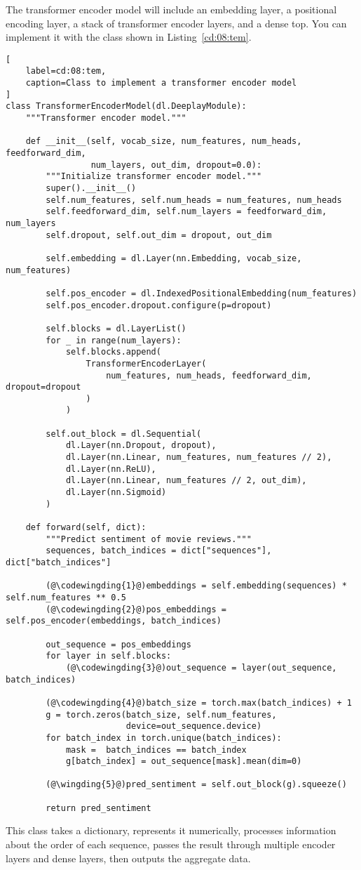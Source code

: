 The transformer encoder model will include an embedding layer, a positional encoding layer, a stack of transformer encoder layers, and a dense top.
You can implement it with the class shown in Listing~\ref{cd:08:tem}.
\begin{lstlisting}[
    label=cd:08:tem,
    caption=Class to implement a transformer encoder model
]
class TransformerEncoderModel(dl.DeeplayModule):
    """Transformer encoder model."""
    
    def __init__(self, vocab_size, num_features, num_heads, feedforward_dim,
                 num_layers, out_dim, dropout=0.0):
        """Initialize transformer encoder model."""
        super().__init__()
        self.num_features, self.num_heads = num_features, num_heads
        self.feedforward_dim, self.num_layers = feedforward_dim, num_layers
        self.dropout, self.out_dim = dropout, out_dim

        self.embedding = dl.Layer(nn.Embedding, vocab_size, num_features)
        
        self.pos_encoder = dl.IndexedPositionalEmbedding(num_features)
        self.pos_encoder.dropout.configure(p=dropout)

        self.blocks = dl.LayerList()
        for _ in range(num_layers):
            self.blocks.append(
                TransformerEncoderLayer(
                    num_features, num_heads, feedforward_dim, dropout=dropout
                )
            )
            
        self.out_block = dl.Sequential(
            dl.Layer(nn.Dropout, dropout),
            dl.Layer(nn.Linear, num_features, num_features // 2), 
            dl.Layer(nn.ReLU),
            dl.Layer(nn.Linear, num_features // 2, out_dim), 
            dl.Layer(nn.Sigmoid)
        )

    def forward(self, dict):
        """Predict sentiment of movie reviews."""
        sequences, batch_indices = dict["sequences"], dict["batch_indices"]

        (@\codewingding{1}@)embeddings = self.embedding(sequences) * self.num_features ** 0.5
        (@\codewingding{2}@)pos_embeddings = self.pos_encoder(embeddings, batch_indices)
        
        out_sequence = pos_embeddings
        for layer in self.blocks:
            (@\codewingding{3}@)out_sequence = layer(out_sequence, batch_indices)

        (@\codewingding{4}@)batch_size = torch.max(batch_indices) + 1
        g = torch.zeros(batch_size, self.num_features, 
                        device=out_sequence.device) 
        for batch_index in torch.unique(batch_indices):
            mask =  batch_indices == batch_index
            g[batch_index] = out_sequence[mask].mean(dim=0)

        (@\wingding{5}@)pred_sentiment = self.out_block(g).squeeze()

        return pred_sentiment
\end{lstlisting}
This class takes a dictionary, represents it numerically, processes information about the order of each sequence, passes the result through multiple encoder layers and dense layers, then outputs the aggregate data.

